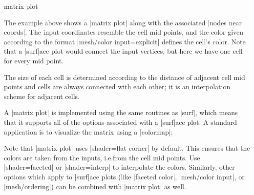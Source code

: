 {\begin{plottype}[/pgfplots]{matrix plot}
\begin{codeexample}[]
\end{codeexample}
    The example above shows a |matrix plot| along with the associated
    |nodes near coords|. The input coordinates resemble the cell mid points, and
    the color given according to the format |mesh/color input=explicit| defines
    the cell's color. Note that a |surf|ace plot would connect the input
    vertices, but here we have one cell for every mid point.

    The size of each cell is determined according to the distance of adjacent
    cell mid points and cells are always connected with each other; it is an
    interpolation scheme for adjacent cells.

    A |matrix plot| is implemented using the same routines as |surf|, which
    means that it supports all of the options associated with a |surf|ace plot.
    A standard application is to visualize the matrix using a |colormap|:
\begin{codeexample}[]
\end{codeexample}
    Note that |matrix plot| uses |shader=flat corner| by default. This ensures
    that the colors are taken from the inputs, i.e.\@ from the cell mid points.
    Use |shader=faceted| or |shader=interp| to interpolate the colors.
    Similarly, other options which apply to |surf|ace plots (like
    |faceted color|, |mesh/color input|, or |mesh/ordering|) can be combined
    with |matrix plot| as well.


\end{plottype}}
